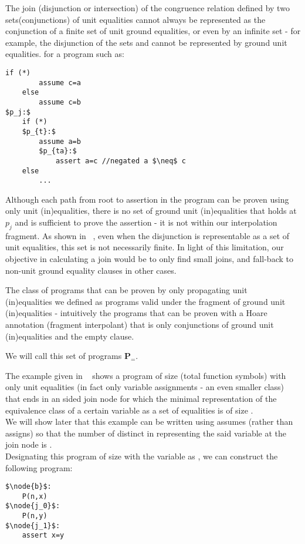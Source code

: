 The join (disjunction or intersection) of the congruence relation defined by two sets(conjunctions) of unit equalities cannot always be represented as the conjunction of a finite set of unit ground equalities, or even by an infinite set - for example, the disjunction of the sets  and  cannot be represented by ground unit equalities. for a program such as:

\begin{lstlisting}[caption={non unit join},label=snippet3.5]
	if (*)
		assume c=a
	else
		assume c=b
$p_j:$
	if (*)
	$p_{t}:$
		assume a=b
		$p_{ta}:$
			assert a=c //negated a $\neq$ c
	else
		...
\end{lstlisting}

Although each path from root to assertion in the program can be proven using only unit (in)equalities, 
there is no set of ground unit (in)equalities that holds at $p_j$ and is sufficient to prove the assertion - 
it is not within our interpolation fragment.
As shown in ~\cite{GulwaniTiwariNecula04}, even when the disjunction is representable as a set of unit equalities, this set is not necessarily finite. 
In light of this limitation, our objective in calculating a join would be to only find small joins, and fall-back to non-unit ground equality clauses in other cases.

The class of programs that can be proven by only propagating unit \\
(in)equalities we defined as programs valid under the fragment of ground unit \\ 
(in)equalities - intuitively the programs that can be proven with a Hoare annotation (fragment interpolant) that is only conjunctions of ground unit\\
 (in)equalities and the empty clause.

We will call this set of programs $\mathbf{P}_{=}$.

The example given in ~\cite{GulwaniNecula07} shows a program of size  (total function symbols) with only unit equalities (in fact only variable assignments - an even smaller class) that ends in an  sided join node for which the minimal representation of the equivalence class of a certain variable as a set of equalities is of size .\\
We will show later that this example can be written using assumes (rather than assigns) so that the number of distinct \GFAECSet in representing the said variable at the join node is .\\
Designating this program of size  with the variable  as , we can construct the following program:
\begin{lstlisting}[caption={exponential join proof},label=snippet3.6]
$\node{b}$:
	P(n,x)
$\node{j_0}$:
	P(n,y)
$\node{j_1}$:
	assert x=y
\end{lstlisting}

